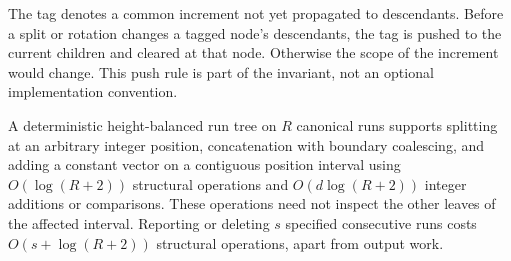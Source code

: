 The tag denotes a common increment not yet propagated to descendants.
Before a split or rotation changes a tagged node's descendants, the tag is
pushed to the current children and cleared at that node. Otherwise the scope
of the increment would change. This push rule is part of the invariant,
not an optional implementation convention.

\begin{proposition}
\label{prop:run-tree}
A deterministic height-balanced run tree on $R$ canonical runs supports
splitting at an arbitrary integer position, concatenation with boundary
coalescing, and adding a constant vector on a contiguous position interval
using $O(\log(R+2))$ structural operations and $O(d\log(R+2))$ integer
additions or comparisons. These operations need not inspect the other leaves
of the affected interval. Reporting or deleting $s$ specified consecutive
runs costs $O(s+\log(R+2))$ structural operations, apart from output work.
\end{proposition}

